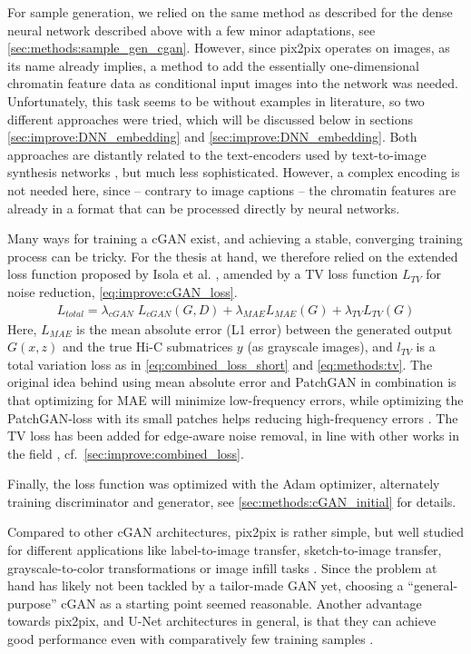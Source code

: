 For sample generation, we relied on the same method as described for the dense neural network described above
with a few minor adaptations, see \cref{sec:methods:sample_gen_cgan}.
However, since pix2pix operates on images, as its name already implies, 
a method to add the essentially one-dimensional chromatin feature data as conditional input images into the network was needed.
Unfortunately, this task seems to be without examples in literature, so two different approaches were tried,
which will be discussed below in sections \ref{sec:improve:DNN_embedding} and \ref{sec:improve:DNN_embedding}.
Both approaches are distantly related to the text-encoders used by text-to-image synthesis networks 
\cite{Reed2016b,Xu2018}, but much less sophisticated. 
However, a complex encoding is not needed here, since -- contrary to image captions -- the chromatin features are already in a format that can be processed directly by neural networks.

Many ways for training a cGAN exist, and achieving a stable, converging training process can be tricky.
For the thesis at hand, we therefore relied on the  extended loss function proposed by Isola et al. \cite{Isola2017}, 
amended by a TV loss function $L_\mathit{TV}$ for noise reduction, \cref{eq:improve:cGAN_loss}.
\begin{align}
 L_\mathit{total} = \lambda_\mathit{cGAN} \; L_\mathit{cGAN}(G,D) + \lambda_\mathit{MAE}L_\mathit{MAE}(G) + \lambda_\mathit{TV}L_\mathit{TV}(G) \label{eq:improve:cGAN_loss}
\end{align}
Here, $L_\mathit{MAE}$ is the mean absolute error (L1 error) between the generated output $G(x,z)$ and the true Hi-C submatrices $y$ (as grayscale images), 
and $l_\mathit{TV}$ is a total variation loss as in \cref{eq:combined_loss_short} and \cref{eq:methods:tv}.
The original idea behind using mean absolute error and PatchGAN in combination is that optimizing for MAE 
will minimize low-frequency errors, while optimizing the PatchGAN-loss with its small patches helps reducing high-frequency errors \cite{Isola2017}.
The TV loss has been added for edge-aware noise removal, in line with other works in the field \cite{Hong2020}, cf.~\cref{sec:improve:combined_loss}.

Finally, the loss function was optimized with the Adam optimizer,
alternately training discriminator and generator,
see \cref{sec:methods:cGAN_initial} for details.

Compared to other cGAN architectures, pix2pix is rather simple, but well studied for different applications like label-to-image transfer,
sketch-to-image transfer, grayscale-to-color transformations or image infill tasks \cite{Isola2017}.
Since the problem at hand has likely not been tackled by a tailor-made GAN yet, 
choosing a ``general-purpose'' cGAN as a starting point seemed reasonable.
Another advantage towards pix2pix, and U-Net architectures in general, 
is that they can achieve good performance even with comparatively few training samples \cite{Isola2017, Ronneberger2015}.

